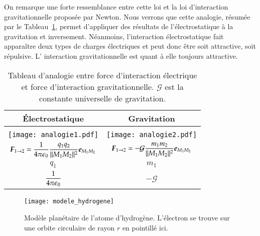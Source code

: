 On remarque une forte ressemblance entre cette loi et la loi d'interaction gravitationnelle
proposée par Newton. Nous verrons que cette analogie, résumée par le Tableau~\ref{tab:analogie},
permet d'appliquer des résultats de l'électrostatique à la gravitation et inversement.
Néanmoins, l'interaction électrostatique fait apparaître deux types de charges
électriques et peut donc être soit attractive, soit répulsive. L'
interaction gravitationnelle est quant à elle toujours attractive.

\begin{table}[h!]
	\centering
	\caption{Tableau d'analogie entre force d'interaction électrique et 
	force d'interaction gravitationnelle. $\mathcal{G}$ est la constante 
	universelle de gravitation.}
	\label{tab:analogie}
	\begin{tabular}{c|c}
		Électrostatique 	&	Gravitation \\[1em] \hline \\[0.5em]
		\texttt{[image: analogie1.pdf]} & \texttt{[image: analogie2.pdf]} \\[2em]
		$\vecf_{1 \rightarrow 2} = \dfrac{1}{4\pi\epsilon_0}
	                                  \dfrac{q_1 q_2}{||M_1M_2||^2}
					  \mitbf{e}_{M_1M_2}$
					& $\vecf_{1 \rightarrow 2} = - \mathcal{G}
	                                  \dfrac{m_1 m_2}{||M_1M_2||^2}
					  \mitbf{e}_{M_1M_2}$ \\[1em]
		$q_1$			&	$m_1$ \\[1em]
		$\dfrac{1}{4\pi\epsilon_0}$		&	$-\mathcal{G}$\\
	\end{tabular}
\end{table}

\begin{figure}[h!]
	\centering
	\texttt{[image: modele\_hydrogene]}
	\caption{Modèle planétaire de l'atome d'hydrogène. L'électron 
	se trouve sur une orbite circulaire de rayon $r$ en pointillé ici.}%
	\label{fig:hydrogene}
\end{figure}

